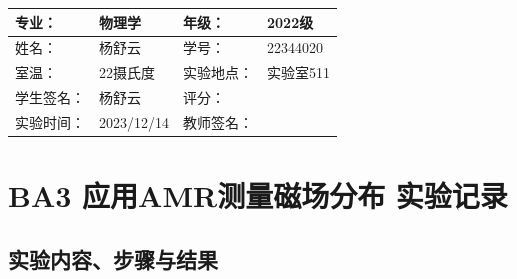 \documentclass[dvipsnames, svgnames,a4paper,11pt]{article}
\begin{document}
	\clearpage
	\begin{table}
		\renewcommand\arraystretch{1.7}
		\centering
		\begin{tabularx}{\textwidth}{|X|X|X|X|}
			\hline
			专业： & 物理学 & 年级： & 2022级 \\
			\hline
			姓名： & 杨舒云 & 学号： & 22344020\\
			\hline
			室温： & 22摄氏度 & 实验地点： & 实验室511 \\
			\hline
			学生签名：& 杨舒云 & 评分： &\\
			\hline
			实验时间：& 2023/12/14 & 教师签名：&\\
			\hline
		\end{tabularx}
	\end{table}
	
	\section{BA3 应用AMR测量磁场分布 \quad\heiti 实验记录}
	\subsection{实验内容、步骤与结果}
	
\end{document}
